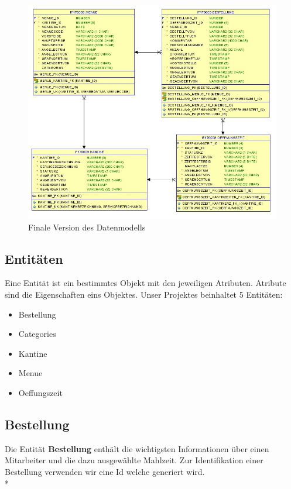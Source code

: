 \begin{figure}[htp]
    \centering
    \includegraphics[scale=0.5]{pics/erd.jpeg}
    \caption{Finale Version des Datenmodells}
    \label{fig:impl:ERDFinal}
\end{figure}

\pagebreak

\subsection{Entitäten}
\author{David Ignjatovic}

Eine Entität ist ein bestimmtes Objekt mit den jeweiligen Atributen. Atribute sind die Eigenschaften eins Objektes.
Unser Projektes beinhaltet 5 Entitäten:

\begin{itemize}
  \item Bestellung
  \item Categories
  \item Kantine
  \item Menue
  \item Oeffungszeit
\end{itemize}

\subsection{Bestellung} 

Die Entität \textbf{Bestellung} enthält die wichtigsten Informationen über einen Mitarbeiter und die dazu ausgewählte Mahlzeit.
Zur Identifikation einer Bestellung verwenden wir eine Id welche generiert wird. \\*

